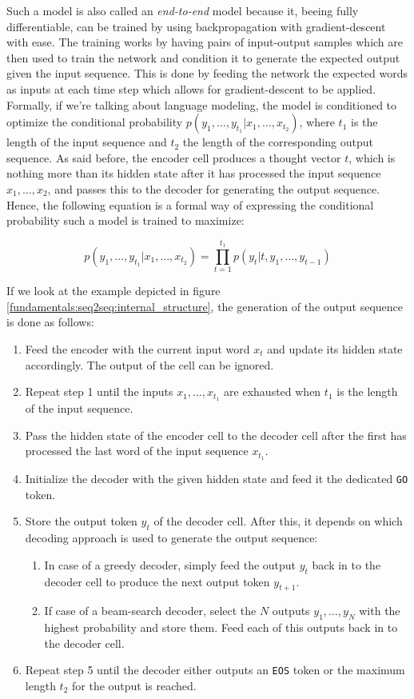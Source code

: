 Such a model is also called an \emph{end-to-end} model because it, beeing fully differentiable, can be trained by using backpropagation with gradient-descent with ease. The training works by having pairs of input-output samples which are then used to train the network and condition it to generate the expected output given the input sequence. This is done by feeding the network the expected words as inputs at each time step which allows for gradient-descent to be applied. Formally, if we're talking about language modeling, the model is conditioned to optimize the conditional probability $p(y_1,\dots,y_{t_1}|x_1,\dots,x_{t_2})$, where $t_1$ is the length of the input sequence and $t_2$ the length of the corresponding output sequence. As said before, the encoder cell produces a thought vector $t$, which is nothing more than its hidden state after it has processed the input sequence $x_1,\dots,x_2$, and passes this to the decoder for generating the output sequence. Hence, the following equation is a formal way of expressing the conditional probability such a model is trained to maximize:

\begin{equation}
p(y_1,\dots,y_{t_1}|x_1,\dots,x_{t_2}) = \prod_{t=1}^{t_1} p(y_t|t,y_1,\dots,y_{t-1})
\end{equation}

If we look at the example depicted in figure \ref{fundamentals:seq2seq:internal_structure}, the generation of the output sequence is done as follows:

\begin{enumerate}
	\item Feed the encoder with the current input word $x_t$ and update its hidden state accordingly. The output of the cell can be ignored.
	\item Repeat step 1 until the inputs $x_1,\dots,x_{t_1}$ are exhausted when $t_1$ is the length of the input sequence.
	\item Pass the hidden state of the encoder cell to the decoder cell after the first has processed the last word of the input sequence $x_{t_1}$.
	\item Initialize the decoder with the given hidden state and feed it the dedicated \texttt{GO} token.
	\item Store the output token $y_t$ of the decoder cell. After this, it depends on which decoding approach is used to generate the output sequence:
	\begin{enumerate}
		\item In case of a greedy decoder, simply feed the output $y_t$ back in to the decoder cell to produce the next output token $y_{t+1}$.
		\item If case of a beam-search decoder, select the $N$ outputs $y_1,\dots,y_{N}$ with the highest probability and store them. Feed each of this outputs back in to the decoder cell.
	\end{enumerate}
	\item Repeat step 5 until the decoder either outputs an \texttt{EOS} token or the maximum length $t_2$ for the output is reached.
\end{enumerate}

